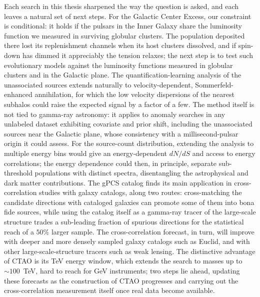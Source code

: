 Each search in this thesis sharpened the way the question is asked, and each leaves a natural set of next steps. For the Galactic Center Excess, our constraint is conditional: it holds if the pulsars in the Inner Galaxy share the luminosity function we measured in surviving globular clusters. The population deposited there lost its replenishment channels when its host clusters dissolved, and if spin-down has dimmed it appreciably the tension relaxes; the next step is to test such evolutionary models against the luminosity functions measured in globular clusters and in the Galactic plane. The quantification-learning analysis of the unassociated sources extends naturally to velocity-dependent, Sommerfeld-enhanced annihilation, for which the low velocity dispersions of the nearest subhalos could raise the expected signal by a factor of a few. The method itself is not tied to gamma-ray astronomy: it applies to anomaly searches in any unlabeled dataset exhibiting covariate and prior shift, including the unassociated sources near the Galactic plane, whose consistency with a millisecond-pulsar origin it could assess. For the source-count distribution, extending the analysis to multiple energy bins would give an energy-dependent $dN/dS$ and access to energy correlations; the energy dependence could then, in principle, separate sub-threshold populations with distinct spectra, disentangling the astrophysical and dark matter contributions. The gPCS catalog finds its main application in cross-correlation studies with galaxy catalogs, along two routes: cross-matching the candidate directions with cataloged galaxies can promote some of them into bona fide sources, while using the catalog itself as a gamma-ray tracer of the large-scale structure trades a sub-leading fraction of spurious directions for the statistical reach of a $50\%$ larger sample. The cross-correlation forecast, in turn, will improve with deeper and more densely sampled galaxy catalogs such as Euclid, and with other large-scale-structure tracers such as weak lensing. The distinctive advantage of CTAO is its TeV energy window, which extends the search to masses up to $\sim 100$~TeV, hard to reach for GeV instruments; two steps lie ahead, updating these forecasts as the construction of CTAO progresses and carrying out the cross-correlation measurement itself once real data become available.

